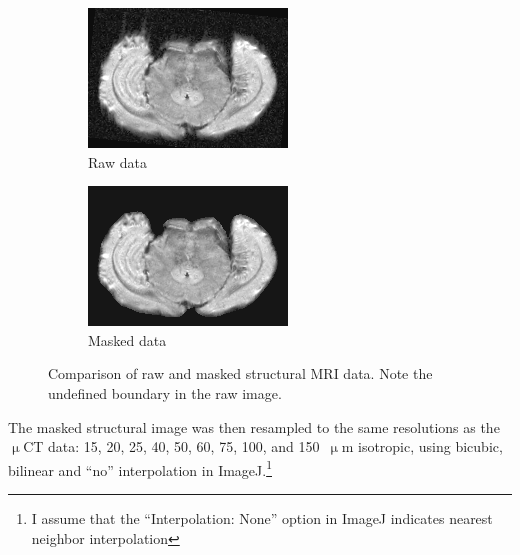 \documentclass[11pt]{article}
\begin{document}
\begin{figure}[h]
  \centering
  \begin{subfigure}[b]{0.45\textwidth}
    \centering
    \includegraphics[width=0.8\linewidth]{figs/struct_orig}
    \caption{Raw data}
  \end{subfigure}
  \hspace{1em}
  \begin{subfigure}[b]{0.45\textwidth}
    \centering
    \includegraphics[width=0.8\linewidth]{figs/struct_masked}
    \caption{Masked data}
  \end{subfigure}
  \captionsetup{width=0.9\textwidth}
  \caption{Comparison of raw and masked structural MRI data. Note the undefined boundary
  in the raw image.}
  \label{fig:mri_mask}
\end{figure}

The masked structural image was then resampled to the same resolutions as the
$\upmu$CT data: 15, 20, 25, 40, 50, 60, 75, 100, and 150~$\upmu$m isotropic,
using bicubic, bilinear and ``no'' interpolation in ImageJ.\footnote{I assume that
  the ``Interpolation: None'' option in ImageJ indicates nearest neighbor interpolation}
\end{document}
